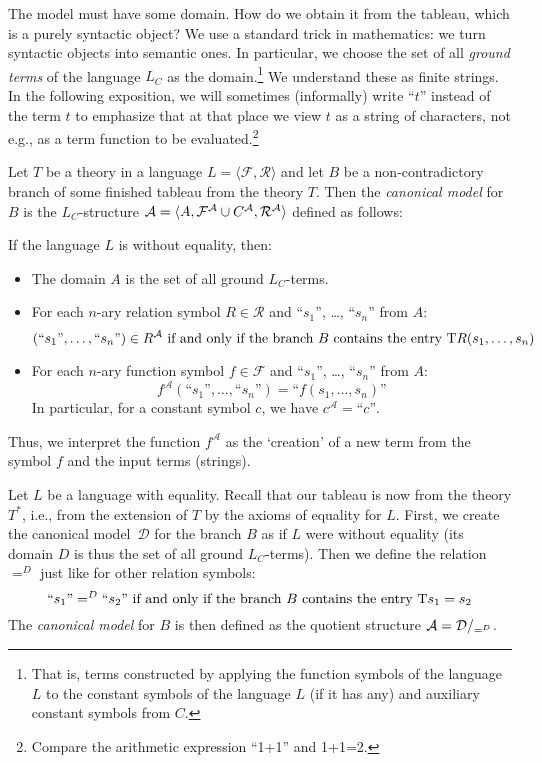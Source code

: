 The model must have some domain. How do we obtain it from the tableau, which is a purely syntactic object? We use a standard trick in mathematics: we turn syntactic objects into semantic ones. In particular, we choose the set of all \emph{ground terms} of the language $L_C$ as the domain.\footnote{That is, terms constructed by applying the function symbols of the language $L$ to the constant symbols of the language $L$ (if it has any) and auxiliary constant symbols from $C$.} We understand these as finite strings. In the following exposition, we will sometimes (informally) write ``$t$'' instead of the term $t$ to emphasize that at that place we view $t$ as a string of characters, not e.g., as a term function to be evaluated.\footnote{Compare the arithmetic expression ``1+1'' and 1+1=2.}

\begin{definition}\label{definition:canonical-model-predicate}
Let $T$ be a theory in a language $L=\langle\mathcal F,\mathcal R\rangle$ and let $B$ be a non-contradictory branch of some finished tableau from the theory $T$. Then the \emph{canonical model} for $B$ is the $L_C$-structure $\mathcal{A}=\langle A,\mathcal F^\mathcal A\cup C^\mathcal A,\mathcal R^\mathcal A\rangle$ defined as follows:

If the language $L$ is without equality, then:
\begin{itemize}
    \item The domain $A$ is the set of all ground $L_C$-terms.
    \item For each $n$-ary relation symbol $R\in\mathcal R$ and ``$s_1$'', \dots, ``$s_n$'' from $A$:
    $$
    (\text{``$s_1$''},\dots,\text{``$s_n$''})\in R^\mathcal A\text{ if and only if the branch $B$ contains the entry $\mathrm{T} R(s_1,\dots,s_n)$}
    $$
    \item For each $n$-ary function symbol $f\in\mathcal F$ and ``$s_1$'', \dots, ``$s_n$'' from $A$:
    $$
    f^\mathcal A(\text{``$s_1$''},\dots,\text{``$s_n$''})=\text{``$f(s_1,\dots,s_n)$''}
    $$
    In particular, for a constant symbol $c$, we have $c^\mathcal A=\text{``$c$''}$.
\end{itemize}
Thus, we interpret the function $f^\mathcal A$ as the `creation' of a new term from the symbol $f$ and the input terms (strings). 

Let $L$ be a language with equality. Recall that our tableau is now from the theory $T^*$, i.e., from the extension of $T$ by the axioms of equality for $L$. First, we create the canonical model~$\mathcal D$ for the branch $B$ as if $L$ were without equality (its domain $D$ is thus the set of all ground $L_C$-terms). Then we define the relation $=^D$ just like for other relation symbols:
$$
\text{``$s_1$''}=^D\text{``$s_2$''}\text{ if and only if the branch $B$ contains the entry $\mathrm{T} s_1=s_2$}
$$
The \emph{canonical model} for $B$ is then defined as the quotient structure $\mathcal{A}=\mathcal{D}/_{=^D}$.
\end{definition}

